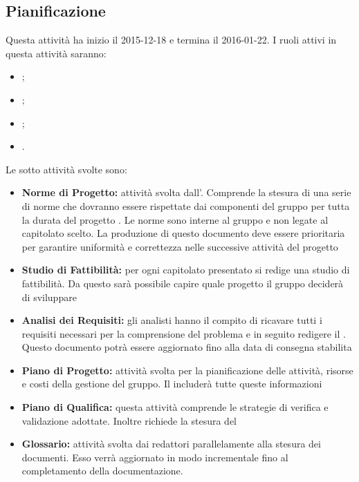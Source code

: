 \documentclass[12pt,a4paper]{article}
\begin{document}
\subsection{Pianificazione} %
Questa attività ha inizio il 2015-12-18 e termina il 2016-01-22. I ruoli attivi in questa attività saranno:
\begin{itemize}
	\item \PM;
	\item \AM;
	\item \AN;
	\item \VR.
\end{itemize}
Le sotto attività svolte sono:
\begin{itemize}
	\item \textbf{Norme di Progetto:} attività svolta dall’\AM. Comprende la stesura di una serie di norme che dovranno essere rispettate dai componenti del gruppo per tutta la durata del progetto \prjL. Le norme sono interne al gruppo e non legate al capitolato scelto. La produzione di questo documento deve essere prioritaria per garantire uniformità e correttezza nelle successive attività del progetto
	\item \textbf{Studio di Fattibilità:} per ogni capitolato presentato si redige una studio di fattibilità. Da questo sarà possibile capire quale progetto il gruppo deciderà di sviluppare
	\item \textbf{Analisi dei Requisiti:} gli analisti hanno il compito di ricavare tutti i requisiti necessari per la comprensione del problema e in seguito redigere il \AdR. Questo documento potrà essere aggiornato fino alla data di consegna stabilita
	\item \textbf{Piano di Progetto:} attività svolta per la pianificazione delle attività, risorse e costi della gestione del gruppo. Il \PdP{} includerà tutte queste informazioni
	\item \textbf{Piano di Qualifica:} questa attività comprende le strategie di verifica e validazione adottate. Inoltre richiede la stesura del \PdQ
	\item \textbf{Glossario:} attività svolta dai redattori parallelamente alla stesura dei documenti. Esso verrà aggiornato in modo incrementale fino al completamento della documentazione.
\end{itemize}
\end{document}
